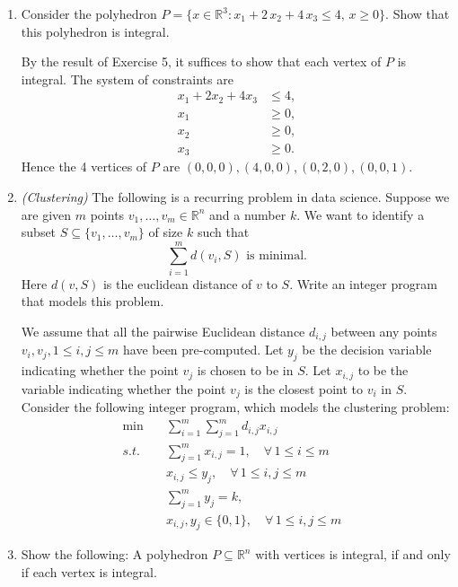 \documentclass[11pt]{article}
\newcommand{\setR}{\mathbb{R}}
\renewcommand{\leq}{\leqslant}
\renewcommand{\geq}{\geqslant}
\begin{document}
\begin{enumerate}[1)]
 \item Consider the polyhedron $P = \{ x \in \setR^3 \colon x_1 + 2\,x_2 + 4\,
  x_3 \leq 4, \, x\geq0\}$. Show that this polyhedron is
  integral. 

\begin{solution}
By the result of Exercise 5, it suffices to show that each vertex of $P$ is integral. 
The system of constraints are
\begin{align*}
  x_1 + 2x_2 + 4x_3 &\leq 4, \\
  x_1 &\geq 0, \\
  x_2 &\geq 0, \\
  x_3 &\geq 0. 
\end{align*}
Hence the 4 vertices of $P$ are $(0,0,0), (4,0,0), (0,2,0), (0,0,1)$.
\end{solution}


\item \emph{(Clustering)} 
The following is a recurring problem in data science. Suppose we are given $m$ points $v_1,\dots,v_m ∈ ℝ^n$ and a number $k$. We want to identify a subset $S ⊆ \{v_1,\dots,v_m\}$ of size $k$ such that
\begin{displaymath}
  ∑_{i=1}^m d(v_i, S)  \text{ is minimal.} 
\end{displaymath}
Here $d (v,S)$ is the euclidean distance of $v$ to $S$. 
Write an integer program that models this problem.

\begin{solution}
We assume that all the pairwise Euclidean distance $d_{i,j}$ between any points $v_i, v_j, 1\leq i,j\leq m$ have been pre-computed.
Let $y_j$ be the decision variable indicating whether the point $v_j$ is chosen to be in $S$. 
Let $x_{i,j}$ to be the variable indicating whether the point $v_j$ is the closest point to $v_i$ in $S$. 
Consider the following integer program, which models the clustering problem:
\begin{align*}
  \min \quad & \sum_{i=1}^m \sum_{j=1}^m d_{i,j} x_{i,j} & \\
  s.t. \quad
  & \sum_{j=1}^m x_{i,j} = 1, \quad \forall\, 1\leq i\leq m \\
  & x_{i,j} \leq y_j, \quad \forall\, 1\leq i,j\leq m \\
  & \sum_{j=1}^m y_j = k, \\
  & x_{i,j}, y_j \in \{0,1\}, \quad \forall\, 1\leq i,j\leq m 
\end{align*}
\end{solution}


\item Show the following: A polyhedron $P \subseteq\setR^n$ with vertices is
integral, if and only if each vertex is integral. \label{i:item:3}


\end{enumerate}
\end{document}
